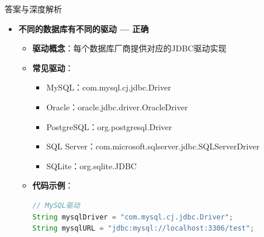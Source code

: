 \documentclass[12pt, a4paper]{ctexart}
\begin{document}
\begin{enumerate}[label=\textbf{\arabic*.}]
\begin{bluebox}{答案与深度解析}
\begin{itemize}[leftmargin=*, nosep, label={}]
\begin{itemize}[label={}, leftmargin=*, nosep]
\begin{lstlisting}[language=Java]
public class JDBCDemo {
    public static void main(String[] args) {
        // 数据库连接信息
        String url = "jdbc:mysql://localhost:3306/test";
        String user = "root";
        String password = "password";

        try {
            // 加载驱动（JDBC 4.0+可省略）
            Class.forName("com.mysql.cj.jdbc.Driver");

            // 建立连接
            Connection conn = DriverManager.getConnection(url, user, password);
            System.out.println("数据库连接成功！");

            // 执行SQL操作...

            conn.close();
        } catch (ClassNotFoundException e) {
            System.out.println("驱动未找到");
        } catch (SQLException e) {
            e.printStackTrace();
        }
    }
}
// JDBC用于建立和管理数据库连接
				      \end{lstlisting}
				            \item \textbf{连接参数}：
				                  \begin{itemize}[label={}, nosep]
					                  \item URL：数据库地址（jdbc:mysql://host:port/db）
					                  \item User：数据库用户名
					                  \item Password：数据库密码
				                  \end{itemize}
			            \end{itemize}

			      \item[B] \textbf{不同的数据库有不同的驱动 — 正确}
			            \begin{itemize}[label={}, leftmargin=*, nosep]
				            \item \textbf{驱动概念}：每个数据库厂商提供对应的JDBC驱动实现
				            \item \textbf{常见驱动}：
				                  \begin{itemize}[label={}, nosep]
					                  \item MySQL：com.mysql.cj.jdbc.Driver
					                  \item Oracle：oracle.jdbc.driver.OracleDriver
					                  \item PostgreSQL：org.postgresql.Driver
					                  \item SQL Server：com.microsoft.sqlserver.jdbc.SQLServerDriver
					                  \item SQLite：org.sqlite.JDBC
				                  \end{itemize}
				            \item \textbf{代码示例}：
				                  \begin{lstlisting}[language=Java]
// MySQL驱动
String mysqlDriver = "com.mysql.cj.jdbc.Driver";
String mysqlURL = "jdbc:mysql://localhost:3306/test";


\end{lstlisting}
\end{itemize}
\end{itemize}
\end{bluebox}
\end{enumerate}
\end{document}
